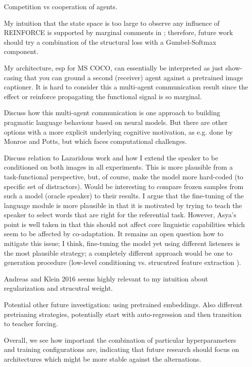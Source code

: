 
Competition vs cooperation of agents. 

My intuition that the state space is too large to observe any influence of REINFORCE is supported by marginal comments in \cite{havrylov2017emergence}; therefore, future work should try a combination of the structural loss with a Gumbel-Softmax component.

My architecture, esp for MS COCO, can essentially be interpreted as just show-casing that you can ground a second (receiver) agent against a pretrained image captioner. It is hard to consider this a multi-agent communication result since the effect or reinforce propagating the functional signal is so marginal. 

Discuss how this multi-agent communication is one approach to building pragmatic language behaviour based on neural models. But there are other options with a more explicit underlying cognitive motivation, as e.g. done by Monroe and Potts, but which faces computational challenges. 

Discuss relation to Lazaridous work and how I extend the speaker to be conditioned on both images in all experiments. This is more plausible from a task-functional perspective, but, of course, make the model more hard-coded (to specific set of distractors). Would be interesting to compare frozen samples from such a model (oracle speaker) to their results. I argue that the fine-tuning of the language module is more plausible in that it is motivated by trying to teach the speaker to select words that are right for the referential task. However, Asya's point is well taken in that this should not affect core linguistic capabilities which seem to be affected by co-adaptation. It remains an open question how to mitigate this issue; I think, fine-tuning the model yet using different listeners is the most plausible strategy; a completely different approach would be one to generation procedure (low-level conditioning vs. strucutred feature extraction ). 

Andreas and Klein 2016 seems highly relevant to my intuition about regularization and strucutral weight. 

Potential other future investigation: using pretrained embeddings.
Also different pretrianing strategies, potentially start with auto-regression and then transition to teacher forcing. 

Overall, we see how important the combination of particular hyperparameters and training configurations are, indicating that future research should focus on architectures which might be more stable against the alternations. 


